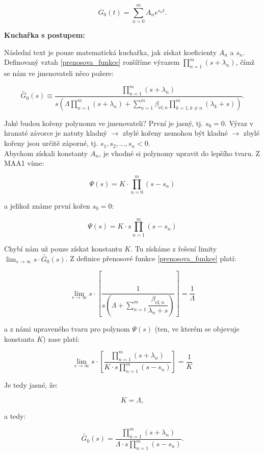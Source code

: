 \begin{equation}
  \boxed{
  G_0(t) = \sum_{n=0}^m A_n e^{s_n t}.
  \label{prenosova_funkce_reseni}
  }
\end{equation}

\small

\textbf{Kuchařka s postupem:}

Následní text je pouze matematická kuchařka, jak získat koeficienty $A_n$ a $s_n$. Definovaný vztah \eqref{prenosova_funkce} rozšíříme výrazem $\prod_{n=1}^m (s+\lambda_n)$, čímž se nám ve jmenovateli něco požere:

$$ \tilde{G_0}(s) \equiv \dfrac{\prod_{n=1}^m (s+\lambda_n)}{s \left ( \Lambda \prod_{n=1}^m (s+\lambda_n)  + \sum_{n=1}^m \beta_{\text{ef},n}\prod_{k=1, k \neq n}^m(\lambda_k + s) \right )}. $$

Jaké budou kořeny polynomu ve jmenovateli? První je jasný, tj. $s_0 = 0$. Výraz v hranaté závorce je natuty kladný $\rightarrow$ zbylé kořeny nemohou být kladné $\rightarrow$ zbylé kořeny jsou určitě záporné, tj. $s_1, s_2, ..., s_n < 0$.\\

Abychom získali konstanty $A_n$, je vhodné si polynomy upravit do lepšího tvaru. Z MAA1 víme:

$$ \Psi(s) = K \cdot \prod_{n=0}^m (s-s_n) $$

a jelikož známe první kořen $s_0 = 0$:

$$ \Psi(s) = K \cdot s \prod_{n=1}^m (s-s_n) $$

Chybí nám už pouze získat konstantu $K$. Tu získáme z řešení limity $\lim_{s \to \infty} s \cdot \tilde{G_0}(s)$. Z definice přenosové funkce \eqref{prenosova_funkce} platí:

$$ \lim_{s \to \infty} s \cdot \left [ \dfrac{1}{s \left ( \Lambda + \sum_{n=1}^m \dfrac{\beta_{\text{ef},n}}{\lambda_n + s} \right )} \right ] = \dfrac{1}{\Lambda} $$

a z námi upraveného tvaru pro polynom $\Psi(s)$ (ten, ve kterém se objevuje konstanta $K$) zase platí:

$$ \lim_{s \to \infty} s \cdot \left [ \dfrac{\prod_{n=1}^m (s+\lambda_n)}{K \cdot s \prod_{n=1}^m (s-s_n)} \right ] = \dfrac{1}{K} $$

Je tedy jasné, že:

$$ K = \Lambda, $$

a tedy:

$$ \tilde{G_0}(s) = \dfrac{\prod_{n=1}^m (s+\lambda_n)}{\Lambda \cdot s \prod_{n=1}^m (s-s_n)}. $$

